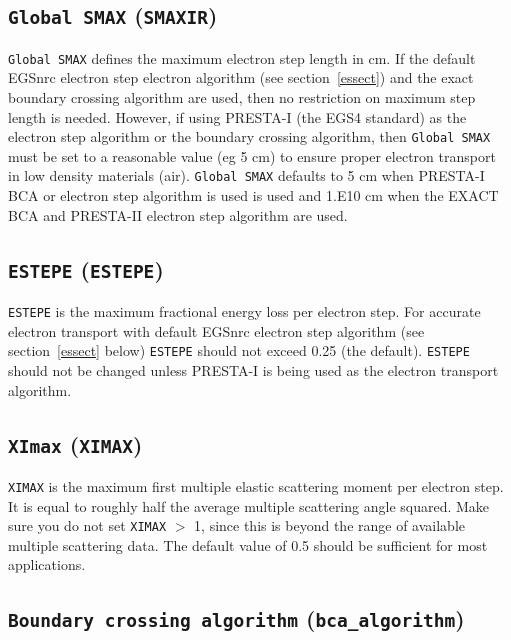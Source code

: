 \documentclass[12pt,twoside]{article}      %
\begin{document}
\subsection{{\tt Global SMAX} ({\tt SMAXIR})}
\label{smaxsect}

{\tt Global SMAX} defines the maximum electron step length in cm.  If the
default EGSnrc electron step electron algorithm (see
section~\ref{essect}) and the exact boundary crossing algorithm are used, then no
restriction on maximum step length is needed.  However, if using
PRESTA-I (the EGS4 standard) as the electron step algorithm or the boundary
crossing algorithm, then
{\tt Global SMAX} must be set to a reasonable value (eg 5 cm) to ensure
proper electron transport in low density materials (air).
{\tt Global SMAX} defaults to 5 cm when PRESTA-I BCA or electron step
algorithm is used is used and 1.E10 cm
when the EXACT BCA and PRESTA-II electron step
algorithm are used.

\subsection{{\tt ESTEPE} ({\tt ESTEPE})}
\label{estepesect}

{\tt ESTEPE} is the maximum fractional energy loss per electron step.
For accurate electron transport with default EGSnrc electron
step algorithm (see section~\ref{essect} below) {\tt ESTEPE} should
not exceed 0.25 (the default).  {\tt ESTEPE} should not be changed
unless PRESTA-I is being used as
the electron transport algorithm.

\subsection{{\tt XImax} ({\tt XIMAX})}

{\tt XIMAX} is the maximum first multiple elastic scattering moment per electron
step.  It is equal to roughly half the average multiple scattering angle
squared.  Make sure you do not set {\tt XIMAX} $>$ 1,
since this is beyond the range of available multiple scattering data.
The default value of 0.5 should be sufficient for most applications.

\subsection{{\tt Boundary crossing algorithm} ({\tt bca\_algorithm})}
\label{bcasect}
\end{document}
